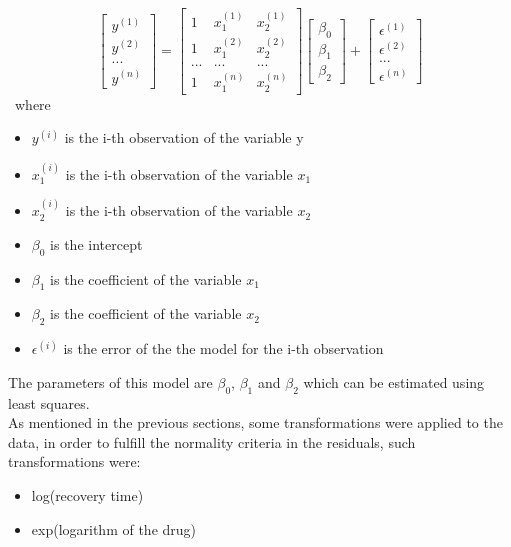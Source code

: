 \documentclass{article}
\begin{document}
$$\begin{bmatrix} y^{(1)} \\y^{(2)} \\... \\ y^{(n)}  \end{bmatrix} = 
\begin{bmatrix} 1 & x_1^{(1)} &  x_2^{(1)}\\1 &  x_1^{(2)}  & x_2 ^{(2)}\\... & ... & ... \\ 
1 &  x_1^{(n)}  & x_2 ^{(n)} \end{bmatrix} \begin{bmatrix} \beta_0 \\\beta_1 \\ \beta_2 \end{bmatrix} +\begin{bmatrix} \epsilon^{(1)} \\ \epsilon^{(2)} \\ ... \\ \epsilon^{(n)} \end{bmatrix}
$$ \
where
\begin{itemize}
    \item $y^{(i)}$ is the i-th observation of the variable y
     \item $x_1^{(i)}$ is the i-th observation of the variable $x_1$
     \item $x_2^{(i)}$ is the i-th observation of the variable $x_2$
     \item $\beta_0$ is the intercept
     \item $\beta_1$ is the coefficient of the variable $x_1$
     \item $\beta_2$ is the coefficient of the variable $x_2$
     \item $\epsilon^{(i)}$ is the error of the the model for the i-th observation
\end{itemize}
The parameters of this model are \(\beta_0\), \(\beta_1\) and \(\beta_2\) which can be estimated using least squares. \\

As mentioned in the previous sections, some transformations were applied to the data, in order to fulfill the normality criteria in the residuals, such transformations were:

\begin{itemize}
    \item log(recovery time)
    \item exp(logarithm of the drug)
\end{itemize}
\end{document}
